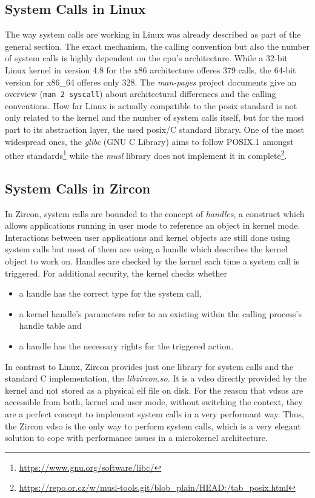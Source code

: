 \subsection{System Calls in Linux}
The way system calls are working in Linux was already described as part of the general section. 
The exact mechanism, the calling convention but also the number of system calls is highly dependent on the \ac{cpu}'s architecture.
While a 32-bit Linux kernel in version 4.8 for the x86 architecture offeres 379 calls, the 64-bit version for x86\_64 offeres only 328\cite{lfd430}.
The \textit{man-pages} project documents give an overview (\texttt{man 2 syscall}) about architectural differences and the calling conventions.
How far Linux is actually compatible to the \ac{posix} standard is not only related to the kernel and the number of system calls itself, but for the most part to its abstraction layer, the used \ac{posix}/C standard library.
One of the most widespread ones, the \textit{glibc} (GNU C Library) aims to follow POSIX.1 amongst other standards\footnote{\url{https://www.gnu.org/software/libc/}} while the \textit{musl} library does not implement it in complete\footnote{\url{https://repo.or.cz/w/musl-tools.git/blob_plain/HEAD:/tab_posix.html}}.



\subsection{System Calls in Zircon}
In Zircon, system calls are bounded to the concept of \textit{handles}, a construct which allows applications running in user mode to reference an object in kernel mode\cite{zircon-handle}.
Interactions between user applications and kernel objects are still done using system calls but most of them are using a handle which describes the kernel object to work on\cite{zircon-concepts}. 
Handles are checked by the kernel each time a system call is triggered.
For additional security, the kernel checks whether
\begin{itemize}
    \item a handle has the correct type for the system call, 
    \item a kernel handle's parameters refer to an existing within the calling process's handle table and
    \item a handle has the necessary rights for the triggered action\cite{zircon-concepts}.
\end{itemize}
% 
In contrast to Linux, Zircon provides just one library for system calls and the standard C implementation, the \textit{libzircon.so}.
It is a \acf{vdso} directly provided by the kernel and not stored as a physical \ac{elf} file on disk.
For the reason that \acp{vdso} are accessible from both, kernel and user mode, without switching the context, they are a perfect concept to implement system calls in a very performant way\cite{vdso-linuxjournal}.
Thus, the Zircon \ac{vdso} is the only way to perform system calls\cite{zircon-vdso}, which is a very elegant solution to cope with performance issues in a microkernel architecture.

